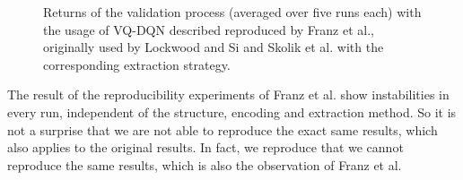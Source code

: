 \begin{figure*}[tb]
\centering
	\scalebox{.62}{}
	\caption{Returns of the validation process (averaged over five runs each)  with the usage of \ac{VQ-DQN} described reproduced by Franz et al.\autocite{instabilities}, originally used by Lockwood and Si\autocite{lockwood} and Skolik et al.\autocite{skolik} with the corresponding extraction strategy.}
\label{results}
\end{figure*}

The result of the reproducibility experiments of Franz et al. show instabilities in every run, independent of the structure, encoding and extraction method. 
So it is not a surprise that we are not able to reproduce the exact same results, which also applies to the original results.
In fact, we reproduce that we cannot reproduce the same results, which is also the observation of Franz et al. 
